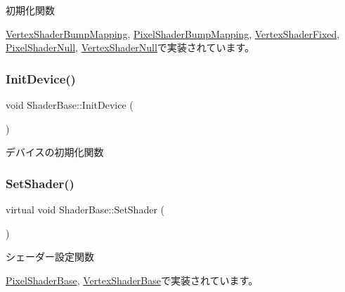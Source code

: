 初期化関数 



\mbox{\hyperlink{class_vertex_shader_bump_mapping_a6c0f59d1f29fd883943a66bfe61b6b03}{Vertex\+Shader\+Bump\+Mapping}}, \mbox{\hyperlink{class_pixel_shader_bump_mapping_ab7807b7c56242e965ddb23e66e1a5d9e}{Pixel\+Shader\+Bump\+Mapping}}, \mbox{\hyperlink{class_vertex_shader_fixed_ae829ff736b33c45543804059255125b6}{Vertex\+Shader\+Fixed}}, \mbox{\hyperlink{class_pixel_shader_null_abfd7a6a986da09061a55d31024219eba}{Pixel\+Shader\+Null}}, \mbox{\hyperlink{class_vertex_shader_null_af30eb8057fe0537bc6ade214647b6fb5}{Vertex\+Shader\+Null}}で実装されています。

\mbox{\label{class_shader_base_aaac3419f1fce5bf12973e827daadbf8c}} 
\subsubsection{\texorpdfstring{Init\+Device()}{InitDevice()}}
{\footnotesize\ttfamily void Shader\+Base\+::\+Init\+Device (\begin{DoxyParamCaption}{ }\end{DoxyParamCaption})\hspace{0.3cm}{\ttfamily [inline]}}



デバイスの初期化関数 

\mbox{\label{class_shader_base_af45063254b80602db8626360d643baee}} 
\subsubsection{\texorpdfstring{Set\+Shader()}{SetShader()}}
{\footnotesize\ttfamily virtual void Shader\+Base\+::\+Set\+Shader (\begin{DoxyParamCaption}{ }\end{DoxyParamCaption})\hspace{0.3cm}{\ttfamily [pure virtual]}}



シェーダー設定関数 



\mbox{\hyperlink{class_pixel_shader_base_a73f41bda5cbb9309ad415cdc471954a2}{Pixel\+Shader\+Base}}, \mbox{\hyperlink{class_vertex_shader_base_a9f93697c5668852850f0a7b7ef7cb67f}{Vertex\+Shader\+Base}}で実装されています。


